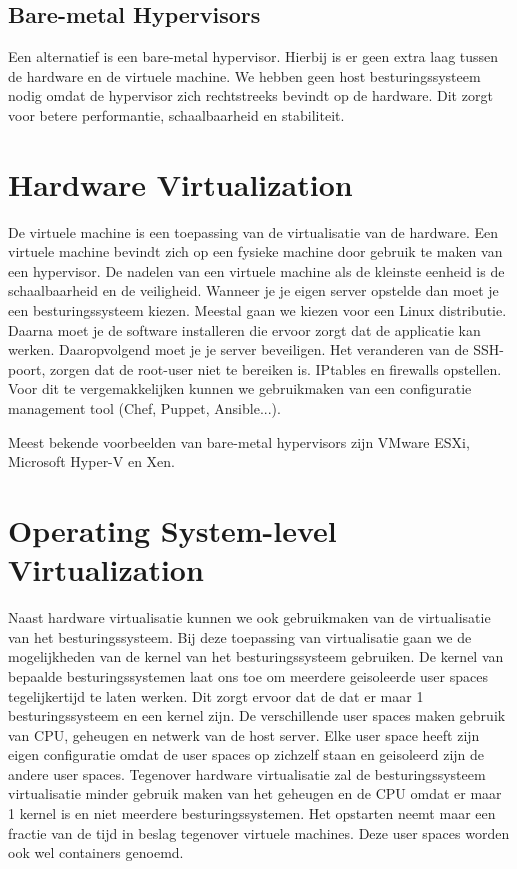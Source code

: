 \documentclass[pdftex,a4paper,12pt,twoside]{report}
\begin{document}
\subsection{Bare-metal Hypervisors}

Een alternatief is een bare-metal hypervisor. Hierbij is er geen extra laag tussen de hardware en de virtuele machine. We hebben geen host besturingssysteem nodig omdat de hypervisor zich rechtstreeks bevindt op de hardware. Dit zorgt voor betere performantie, schaalbaarheid en stabiliteit.

\section{Hardware Virtualization}

De virtuele machine is een toepassing van de virtualisatie van de hardware. Een virtuele machine bevindt zich op een fysieke machine door gebruik te maken van een hypervisor. De nadelen van een virtuele machine als de kleinste eenheid is de schaalbaarheid en de veiligheid. Wanneer je je eigen server opstelde dan moet je een besturingssysteem kiezen. Meestal gaan we kiezen voor een Linux distributie. Daarna moet je de software installeren die ervoor zorgt dat de applicatie kan werken. Daaropvolgend moet je je server beveiligen. Het veranderen van de SSH-poort, zorgen dat de root-user niet te bereiken is. IPtables en firewalls opstellen. Voor dit te vergemakkelijken kunnen we gebruikmaken van een configuratie management tool (Chef, Puppet, Ansible...).

Meest bekende voorbeelden van bare-metal hypervisors zijn VMware ESXi, Microsoft Hyper-V en Xen.

\section{Operating System-level Virtualization}

Naast hardware virtualisatie kunnen we ook gebruikmaken van de virtualisatie van het besturingssysteem. Bij deze toepassing van virtualisatie gaan we de mogelijkheden van de kernel van het besturingssysteem gebruiken. De kernel van bepaalde besturingssystemen laat ons toe om meerdere geisoleerde user spaces tegelijkertijd te laten werken. Dit zorgt ervoor dat de dat er maar 1 besturingssysteem en een kernel zijn. De verschillende user spaces maken gebruik van CPU, geheugen en netwerk van de host server. Elke user space heeft zijn eigen configuratie omdat de user spaces op zichzelf staan en geisoleerd zijn de andere user spaces. Tegenover hardware virtualisatie zal de besturingssysteem virtualisatie minder gebruik maken van het geheugen en de CPU omdat er maar 1 kernel is en niet meerdere besturingssystemen. Het opstarten neemt maar een fractie van de tijd in beslag tegenover virtuele machines. Deze user spaces worden ook wel containers genoemd. 
\end{document}
